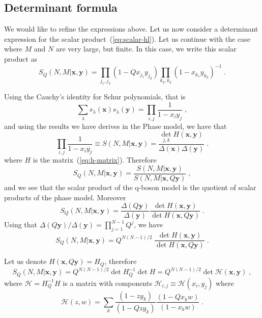 \documentclass[a4paper,11pt]{amsart}
\begin{document}
\subsection{Determinant formula}

We would like to refine the expressions above. Let us now consider a determinant  
expression for the scalar product~(\ref{eq:scalar-hl}). Let us continue with 
the case where \(M\) and \(N\) are very large, but finite. In this case, we write  
this scalar product as 
\begin{equation}
  S_Q(N,M | \bm{x}, \bm{y})  
= \prod_{j_1, j_2} (1-Q x_{j_1} y_{j_2}) \prod_{k_2, k_2}(1 - x_{k_1} y_{k_2})^{-1}\; .
\end{equation}

Using the Cauchy's identity for Schur polynomials, that is 
\begin{equation}
  \sum_\lambda s_\lambda(\bm{x}) s_\lambda(\bm{y}) = \prod_{i,j} \frac{1}{1 - x_i y_j}\; ,
\end{equation}
and using the results we have derives in the Phase model, we have that 
\begin{equation}
  \prod_{i,j}\frac{1}{1 - x_i y_j}  \equiv S(N,M|\bm{x}, \bm{y}) = 
  \frac{\det_{j,k}H(\bm{x},\bm{y})}{\Delta(\bm{x}) \Delta(\bm{y})}\; .
\end{equation}
where \(H\) is the matrix~(\ref{eq:h-matrix}). Therefore
\begin{equation}
  S_Q(N,M | \bm{x}, \bm{y})  
= \frac{S(N,M|\bm{x}, \bm{y})}{S(N,M|\bm{x}, Q\bm{y})}\; , 
\end{equation}
and we see that the scalar product of the q-boson model is the quotient of 
scalar products of the phase model. Moreover
\begin{equation}
  S_Q(N,M | \bm{x}, \bm{y})  
  = \frac{\Delta(Q\bm{y})}{\Delta(\bm{y})}
  \frac{\det H(\bm{x}, \bm{y})}{\det H(\bm{x},Q \bm{y})} \; .
\end{equation}
Using that \(\Delta(Q\bm{y})/ \Delta(\bm{y}) = \prod_{j=1}^{N-1} Q^j\), we have 
\begin{equation}
  S_Q(N,M | \bm{x}, \bm{y}) =  Q^{N(N-1)/2}\;
  \frac{\det H(\bm{x}, \bm{y})}{\det H(\bm{x}, Q \bm{y})} \; .
\end{equation}

Let us denote \(H(\bm{x}, Q\bm{y}) = H_{Q}\), therefore
\begin{equation}
  S_Q(N,M | \bm{x}, \bm{y}) = Q^{N(N-1)/2} \det H_{Q}^{-1} \det H
= Q^{N(N-1)/2} \det \mathcal{H}(\bm{x}, \bm{y}) \; ,
\end{equation}
where \(\mathcal{H} = H_{Q}^{-1} H\) is a matrix with components 
\(\mathcal{H}_{i,j} \equiv \mathcal{H}(x_i, y_j)\) where
\begin{equation}
  \mathcal{H}(z, w) = \sum_{k} \frac{(1 - z y_k)}{(1 - Q z y_k)} 
\frac{(1 - Q x_k w)}{(1 - x_k w)}\; .
\end{equation}
\end{document}
